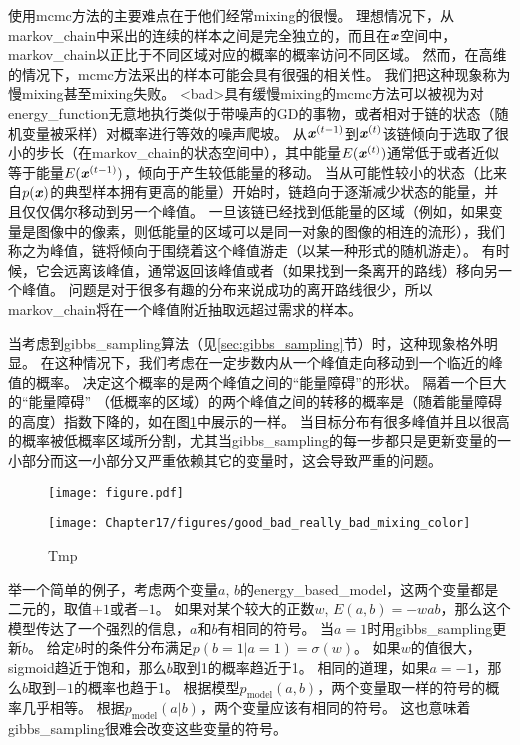 使用\gls{mcmc}方法的主要难点在于他们经常\gls{mixing}的很慢。
理想情况下，从\gls{markov_chain}中采出的连续的样本之间是完全独立的，而且在$\boldsymbol{\mathit{x}}$空间中，\gls{markov_chain}以正比于不同区域对应的概率的概率访问不同区域。
然而，在高维的情况下，\gls{mcmc}方法采出的样本可能会具有很强的相关性。
我们把这种现象称为慢\gls{mixing}甚至\gls{mixing}失败。
<bad>具有缓慢\gls{mixing}的\gls{mcmc}方法可以被视为对\gls{energy_function}无意地执行类似于带噪声的\gls{GD}的事物，或者相对于链的状态（随机变量被采样）对概率进行等效的噪声爬坡。
从$\boldsymbol{\mathit{x}}^{(t-1)}$到$\boldsymbol{\mathit{x}}^{(t)}$该链倾向于选取了很小的步长（在\gls{markov_chain}的状态空间中），其中能量$E(\boldsymbol{\mathit{x}}^{(t)})$通常低于或者近似等于能量$E(\boldsymbol{\mathit{x}}^{(t-1)})$，倾向于产生较低能量的移动。
当从可能性较小的状态（比来自$p(\boldsymbol{\mathit{x}})$的典型样本拥有更高的能量）开始时，链趋向于逐渐减少状态的能量，并且仅仅偶尔移动到另一个峰值。
一旦该链已经找到低能量的区域（例如，如果变量是图像中的像素，则低能量的区域可以是同一对象的图像的相连的流形），我们称之为峰值，链将倾向于围绕着这个峰值游走（以某一种形式的随机游走）。
有时候，它会远离该峰值，通常返回该峰值或者（如果找到一条离开的路线）移向另一个峰值。
问题是对于很多有趣的分布来说成功的离开路线很少，所以\gls{markov_chain}将在一个峰值附近抽取远超过需求的样本。


当考虑到\gls{gibbs_sampling}算法（见\ref{sec:gibbs_sampling}节）时，这种现象格外明显。
在这种情况下，我们考虑在一定步数内从一个峰值走向移动到一个临近的峰值的概率。
决定这个概率的是两个峰值之间的``能量障碍''的形状。
隔着一个巨大的``能量障碍'' （低概率的区域）的两个峰值之间的转移的概率是（随着能量障碍的高度）指数下降的，如在图\ref{fig:chap17_good_bad_really_bad_mixing_color}中展示的一样。
当目标分布有很多峰值并且以很高的概率被低概率区域所分割，尤其当\gls{gibbs_sampling}的每一步都只是更新变量的一小部分而这一小部分又严重依赖其它的变量时，这会导致严重的问题。


\begin{figure}[!htb]
\ifOpenSource
\centerline{\texttt{[image: figure.pdf]}}
\else
	\centerline{\texttt{[image: Chapter17/figures/good\_bad\_really\_bad\_mixing\_color]}}
\fi
	\caption{Tmp}
	\label{fig:chap17_good_bad_really_bad_mixing_color}
\end{figure}


举一个简单的例子，考虑两个变量$a$, $b$的\gls{energy_based_model}，这两个变量都是二元的，取值$+1$或者$-1$。
如果对某个较大的正数$w$, $E(a,b) = - w a b$，那么这个模型传达了一个强烈的信息，$a$和$b$有相同的符号。
当$a=1$时用\gls{gibbs_sampling}更新$b$。
给定$b$时的条件分布满足$p(b=1\vert a=1) = \sigma(w)$。
如果$w$的值很大，sigmoid趋近于饱和，那么$b$取到1的概率趋近于1。
相同的道理，如果$a=-1$，那么$b$取到$-1$的概率也趋于1。
根据模型$p_{\text{model}}(a,b)$，两个变量取一样的符号的概率几乎相等。
根据$p_{\text{model}}(a\vert b)$，两个变量应该有相同的符号。
这也意味着\gls{gibbs_sampling}很难会改变这些变量的符号。

